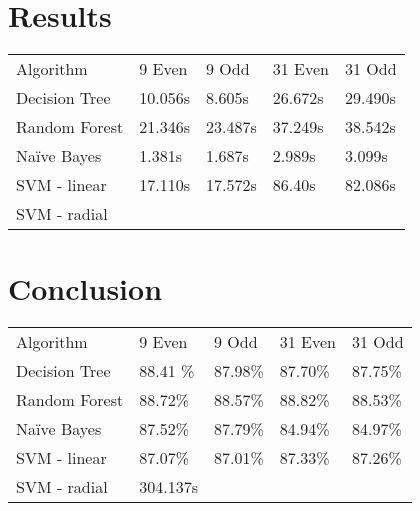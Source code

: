 \documentclass[aps, reprint, amsmath, amssymb]{revtex4-1}
\begin{document}
\section{Results}

\begin{center}
  \begin{tabular}{ | l || l | l | l | l |}
    \hline
    Algorithm & 9 Even & 9 Odd & 31 Even & 31 Odd \\ \hhline{|=||=|=|=|=|}
    Decision Tree & 10.056s & 8.605s & 26.672s & 29.490s \\ \hline
    Random Forest & 21.346s & 23.487s & 37.249s & 38.542s \\ \hline
    Na{\"i}ve Bayes & 1.381s & 1.687s & 2.989s & 3.099s \\ \hline
    SVM - linear & 17.110s & 17.572s & 86.40s & 82.086s \\ \hline
    SVM - radial & & & & \\ 
    \hline
  \end{tabular}
\end{center}
\section{Conclusion}


\begin{center}
  \begin{tabular}{ | l || l | l | l | l |}
    \hline
    Algorithm & 9 Even & 9 Odd & 31 Even & 31 Odd \\ \hhline{|=||=|=|=|=|}

    Decision Tree & 88.41 \% & 87.98\% & 87.70\% & 87.75\% \\ \hline

    Random Forest & 88.72\% & 88.57\% &  88.82\% & 88.53\% \\ \hline

    Na{\"i}ve Bayes & 87.52\% & 87.79\% & 84.94\% & 84.97\% \\ \hline

    SVM - linear & 87.07\% & 87.01\% & 87.33\% & 87.26\% \\ \hline

    SVM - radial & 304.137s & & & \\ 
    \hline
  \end{tabular}
\end{center}
\end{document}
